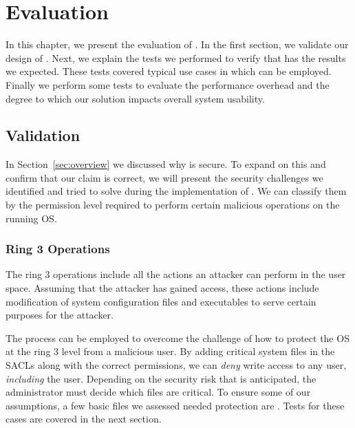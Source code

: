 \chapter{Evaluation}\label{ch:chapter4}

In this chapter, we present the evaluation of . In the first section, we validate our design of . Next, we explain the tests we performed to verify that  has the results we expected. These tests covered typical use cases in which  can be employed. Finally we perform some tests to evaluate the performance overhead and the degree to which our solution impacts overall system usability.

\section{Validation}\label{sec:validation}

\par In Section~\ref{sec:overview} we discussed why  is secure. To expand on this and confirm that our claim is correct, we will present the security challenges we identified and tried to solve during the implementation of . We can classify them by the permission level required to perform certain malicious operations on the running \ac{OS}. 

\subsection{Ring 3 Operations}

\par The ring 3 operations include all the actions an attacker can perform in the user space. Assuming that the attacker has gained  access, these actions include modification of system configuration files and executables to serve certain purposes for the attacker. 
\par The  process can be employed to overcome the challenge of how to protect the \ac{OS} at the ring 3 level from a malicious  user. By adding critical system files in the \acp{SACL} along with the correct permissions, we can \emph{deny} write access to any user, \emph{including} the  user. Depending on the security risk that is anticipated, the administrator must decide which files are critical. To ensure some of our assumptions, a few basic files we assessed needed protection are . Tests for these cases are covered in the next section.

